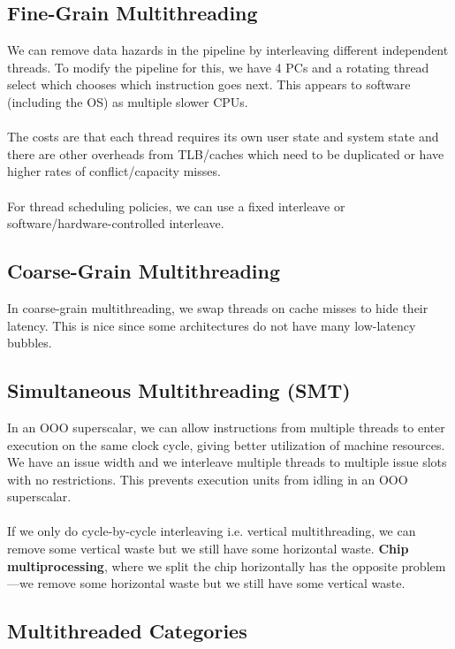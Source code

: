 \documentclass{article}
\begin{document}
\subsection{Fine-Grain Multithreading}

We can remove data hazards in the pipeline by interleaving different independent threads. To modify the pipeline for this, we have 4 PCs and a rotating thread select which chooses which instruction goes next. This appears to software (including the OS) as multiple slower CPUs. \\
\\
The costs are that each thread requires its own user state and system state and there are other overheads from TLB/caches which need to be duplicated or have higher rates of conflict/capacity misses. \\
\\
For thread scheduling policies, we can use a fixed interleave or software/hardware-controlled interleave.

\subsection{Coarse-Grain Multithreading}

In coarse-grain multithreading, we swap threads on cache  misses to hide their latency. This is nice since some architectures do not have many low-latency bubbles.

\subsection{Simultaneous Multithreading (SMT)}

In an OOO superscalar, we can allow instructions from multiple threads to enter execution on the same clock cycle, giving better utilization of machine resources. We have an issue width and we interleave multiple threads to multiple issue slots with no restrictions. This prevents execution units from idling in an OOO superscalar. \\
\\
If we only do cycle-by-cycle interleaving i.e. vertical multithreading, we can remove some vertical waste but we still have some horizontal waste. \textbf{Chip multiprocessing}, where we split the chip horizontally has the opposite problem---we remove some horizontal waste but we still have some vertical waste.

\subsection{Multithreaded Categories}
\end{document}
